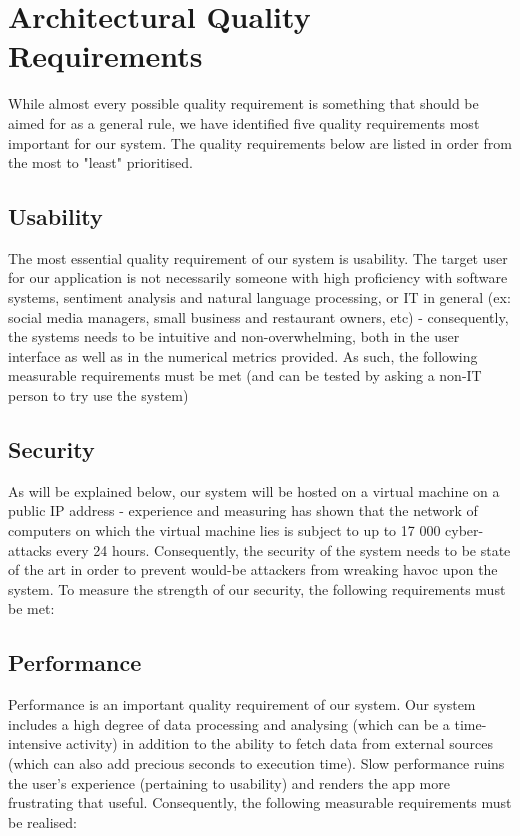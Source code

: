 \documentclass[12pt]{article}
\begin{document}
\newpage
\section{Architectural Quality Requirements}
While almost every possible quality requirement is something that should be aimed for as a general rule, we have identified five quality requirements most important for our system. The quality requirements below are listed in order from the most to "least" prioritised.
\subsection{Usability}
The most essential quality requirement of our system is usability. The target user for our application is not necessarily someone with high proficiency with software systems, sentiment analysis and natural language processing, or IT in general (ex: social media managers, small business and restaurant owners, etc) - consequently, the systems needs to be intuitive and non-overwhelming, both in the user interface as well as in the numerical metrics provided. As such, the following measurable requirements must be met (and can be tested by asking a non-IT person to try use the system)
\subsection{Security}
As will be explained below, our system will be hosted on a virtual machine on a public IP address - experience and measuring has shown that the network of computers on which the virtual machine lies is subject to up to 17 000 cyber-attacks every 24 hours. Consequently, the security of the system needs to be state of the art in order to prevent would-be attackers from wreaking havoc upon the system. To measure the strength of our security, the following requirements must be met:
\subsection{Performance}
Performance is an important quality requirement of our system. Our system includes a high degree of data processing and analysing (which can be a time-intensive activity) in addition to the ability to fetch data from external sources (which can also add precious seconds to execution time). Slow performance ruins the user's experience (pertaining to usability) and renders the app more frustrating that useful. Consequently, the following measurable requirements must be realised:
\end{document}
